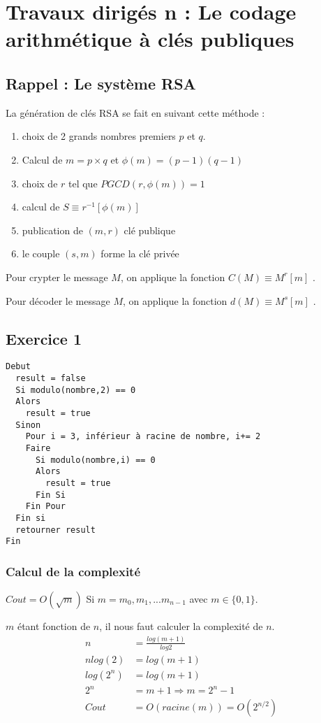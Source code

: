 \chapter{Travaux dirigés n : Le codage arithmétique à clés
publiques}
\section{Rappel : Le système RSA}

La génération de clés RSA se fait en suivant cette méthode :
\begin{enumerate}
  \item choix de 2 grands nombres premiers $p$ et $q$.
  \item Calcul de $m = p \times q$ et $\phi (m)  = (p-1)(q-1)$
  \item choix de $r$ tel que $PGCD(r, \phi (m)) = 1$
  \item calcul de $S \equiv r^{-1} [\phi (m)]$
  \item publication de $(m,r)$ clé publique
  \item le couple $(s,m)$ forme la clé privée
\end{enumerate}

Pour crypter le message $M$, on applique la fonction $C(M) \equiv M^r [m]$
.


Pour décoder le message $M$, on applique la fonction $d(M) \equiv M^s [m]$
.
\section{Exercice 1}
\begin{verbatim}
Debut
  result = false
  Si modulo(nombre,2) == 0
  Alors
    result = true
  Sinon
    Pour i = 3, inférieur à racine de nombre, i+= 2
    Faire
      Si modulo(nombre,i) == 0
      Alors
        result = true
      Fin Si
    Fin Pour
  Fin si
  retourner result
Fin
\end{verbatim}

\subsection{Calcul de la complexité}
$Cout = O(\sqrt{m})$
Si $m = m_0, m_1, ... m_{n-1}$ avec $m \in \{0,1\}$.

$m$ étant fonction de $n$, il nous faut calculer la complexité de $n$.
\begin{align*}
n &= \frac{log(m+1)}{log2}\\
nlog(2) &= log(m+1)\\
log(2^n) &= log(m+1)\\
2^n &= m+1 \Rightarrow m=2^n-1\\
Cout &= O(racine(m)) = O(2^{n/2})
\end{align*}

